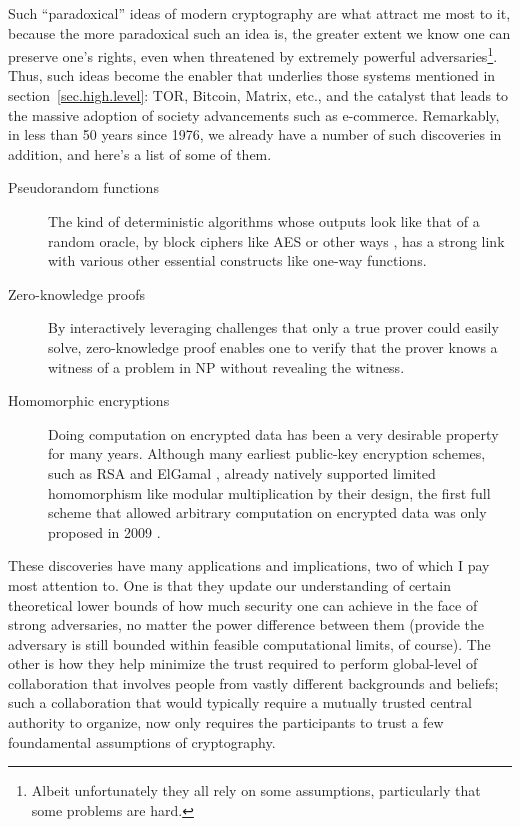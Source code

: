 \documentclass[10pt]{article}
\begin{document}
Such ``paradoxical'' ideas of modern cryptography are what attract me most to
it, because the more paradoxical such an idea is, the greater extent we know
one can preserve one's rights, even when threatened by extremely powerful
adversaries\footnote{Albeit unfortunately they all rely on some assumptions,
particularly that some problems are hard.}.
Thus, such ideas become the enabler that underlies those systems mentioned in
section~\ref{sec.high.level}: TOR, Bitcoin, Matrix, etc., and the
catalyst that leads to the massive adoption of society advancements such as
e-commerce. Remarkably, in less than 50 years since 1976, we already have a
number of such discoveries in addition, and here's a list of some of them.
\begin{description}
\item[Pseudorandom functions] The kind of deterministic algorithms
	whose outputs look like that of a random oracle, by block ciphers like
	AES\cite{aes} or other ways \cite{pseudo.rand.cons.2}, has a strong link
	with various other essential constructs like one-way functions.

\item[Zero-knowledge proofs] By interactively leveraging challenges that only a
	true prover could easily solve, zero-knowledge proof \cite{zero.knowledge}
	enables one to verify that the prover knows a witness of a problem in NP
	\cite{zero.knowledge.np} without revealing the witness.

\item[Homomorphic encryptions] Doing computation on encrypted data has been a
	very desirable property for many years. Although many earliest public-key
	encryption schemes, such as RSA \cite{rsa} and ElGamal \cite{elgamal},
	already natively supported limited homomorphism like modular
	multiplication by their design, the first full scheme that allowed
	arbitrary computation on encrypted data was only proposed in 2009
	\cite{first.full.homo}.
\end{description}

These discoveries have many applications and implications, two of which I pay
most attention to. One is that they update our understanding of certain
theoretical lower bounds of how much security one can achieve in the face of
strong adversaries, no matter the power difference between them (provide the
adversary is still bounded within feasible computational limits, of course).
The other is how they help minimize the trust required to perform global-level
of collaboration that involves people from vastly different backgrounds and
beliefs; such a collaboration that would typically require a mutually trusted
central authority to organize, now only requires the participants to trust a
few foundamental assumptions of cryptography.
\end{document}
